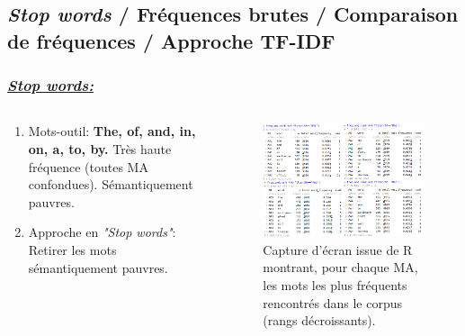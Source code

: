\documentclass[xcolor=dvipsnames]{beamer}
\begin{document}
	\subsection*{\textit{Stop words} / Fréquences brutes / Comparaison de fréquences / Approche TF-IDF}

	\begin{frame}
		\frametitle{\textit{\underline{Stop words:}}}
		\begin{columns}
			\begin{column}{0.4\textwidth} %
				\begin{enumerate}
					\item Mots-outil: \textbf{The, of, and, in, on, a, to, by.} Très haute fréquence (toutes MA confondues). Sémantiquement pauvres. 
					\item Approche en \textit{"Stop words"}: Retirer les mots sémantiquement pauvres.
				\end{enumerate}
			\end{column}
			\begin{column}{0.6\textwidth}
				\begin{figure}[htb] %
					\begin{center} %
						\includegraphics[width=1\textwidth]{word_rank_table.png}
						\caption{Capture d'écran issue de R montrant, pour chaque MA, les mots les plus fréquents rencontrés dans le corpus (rangs décroissants).}\label{Zipf}
					\end{center}
				\end{figure}
			\end{column}
		\end{columns}
	\end{frame}
\end{document}
